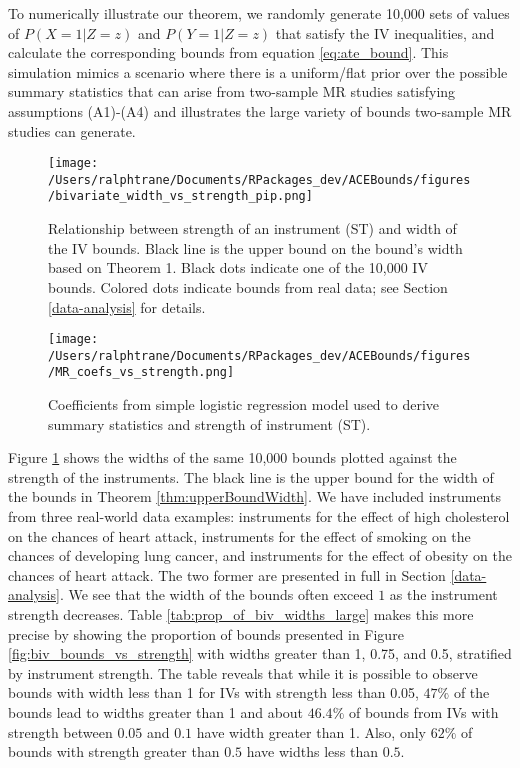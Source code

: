 \documentclass[
]{article}
\theoremstyle{plain}
\begin{document}
To numerically illustrate our theorem, we randomly generate 10,000 sets of values of \(P(X = 1 | Z = z)\) and \(P(Y = 1 | Z = z)\) that satisfy the IV inequalities, and calculate the corresponding bounds from equation \eqref{eq:ate_bound}. This simulation mimics a scenario where there is a uniform/flat prior over the possible summary statistics that can arise from two-sample MR studies satisfying assumptions (A1)-(A4) and illustrates the large variety of bounds two-sample MR studies can generate.

\begin{figure*}
  \centering
  \begin{subfigure}[t]{0.48\textwidth}
    \texttt{[image: /Users/ralphtrane/Documents/RPackages\_dev/ACEBounds/figures/bivariate\_width\_vs\_strength\_pip.png]}
    \caption{Relationship between strength of an instrument (ST) and width of the IV bounds. Black line is the upper bound on the bound's width based on Theorem 1. Black dots indicate one of the 10,000 IV bounds. Colored dots indicate bounds from real data; see Section \ref{data-analysis} for details.}
    \label{fig:biv_width_vs_strength}
  \end{subfigure}%
  \hspace{0.15in}
  \begin{subfigure}[t]{0.48\textwidth}
    \centering
    \texttt{[image: /Users/ralphtrane/Documents/RPackages\_dev/ACEBounds/figures/MR\_coefs\_vs\_strength.png]}
    \caption{Coefficients from simple logistic regression model used to derive summary statistics and strength of instrument (ST).}
    \label{fig:coef_vs_strength}
  \end{subfigure}
  \caption{Illustration of the relationship between instrument strength, and width of bounds obtained from two-sample design and coefficients from logistic regression model.}
  \label{fig:biv_bounds_vs_strength}
\end{figure*}

Figure \ref{fig:biv_width_vs_strength} shows the widths of the same 10,000 bounds plotted against the strength of the instruments. The black line is the upper bound for the width of the bounds in Theorem \ref{thm:upperBoundWidth}. We have included instruments from three real-world data examples: instruments for the effect of high cholesterol on the chances of heart attack, instruments for the effect of smoking on the chances of developing lung cancer, and instruments for the effect of obesity on the chances of heart attack. The two former are presented in full in Section \ref{data-analysis}. We see that the width of the bounds often exceed \(1\) as the instrument strength decreases. Table \ref{tab:prop_of_biv_widths_large} makes this more precise by showing the proportion of bounds presented in Figure \ref{fig:biv_bounds_vs_strength} with widths greater than 1, 0.75, and 0.5, stratified by instrument strength. The table reveals that while it is possible to observe bounds with width less than 1 for IVs with strength less than 0.05, \(47\%\) of the bounds lead to widths greater than 1 and about \(46.4\%\) of bounds from IVs with strength between \(0.05\) and \(0.1\) have width greater than 1. Also, only \(62\%\) of bounds with strength greater than \(0.5\) have widths less than \(0.5\).
\end{document}

